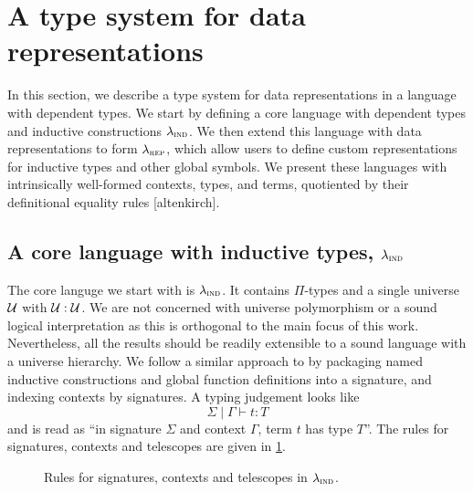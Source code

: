 \section{A type system for data representations}\label{sec:type-system}

In this section, we describe a type system for data representations in a
language with dependent types. We start by defining a core language with
dependent types and inductive constructions $\lambda_{\textsc{ind}}$. We then extend this
language with data representations to form $\lambda_{\textsc{rep}}$, which allow users to
define custom representations for inductive types and other global symbols.
We present these languages with intrinsically well-formed contexts, types, and
terms, quotiented by their definitional equality rules [altenkirch].

\subsection{A core language with inductive types, $\lambda_{\textsc{ind}}$}\label{sub:lambdaind}

The core languge we start with is $\lambda_{\textsc{ind}}$. It contains $\Pi$-types and a
single universe $\mathcal{U}$ with $\mathcal{U} : \mathcal{U}$. We are not concerned with universe
polymorphism or a sound logical interpretation as this is orthogonal to the main
focus of this work. Nevertheless, all the results should be readily extensible
to a sound language with a universe hierarchy.
We follow a similar approach to
\cite{Cockx2018-fk} by packaging named inductive constructions and
global function definitions into a signature, and indexing contexts by
signatures. A typing judgement looks like
\[
  \Sigma \mid \Gamma \vdash t : T
\]
and is read as ``in signature $\Sigma$ and context $\Gamma$, term $t$ has type
$T$''. The rules for signatures, contexts and telescopes are given in \cref{fig:lambdaind-sig-rules}.

\begin{figure}[h]
  \caption{Rules for signatures, contexts and telescopes in $\lambda_{\textsc{ind}}$.}
  \label{fig:lambdaind-sig-rules}
\end{figure}

